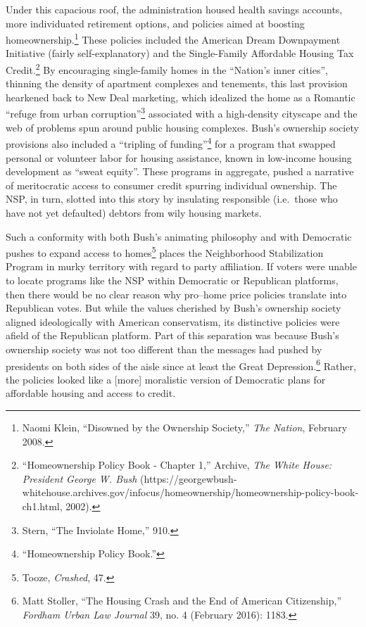 \documentclass[12pt,oneside]{psthesis}
\begin{document}
Under this capacious roof, the administration housed health savings accounts, more individuated retirement options, and policies aimed at boosting homeownership.\footnote{Naomi Klein, ``Disowned by the Ownership Society,'' \emph{The Nation}, February 2008.}
These policies included the American Dream Downpayment Initiative (fairly self-explanatory) and the Single-Family Affordable Housing Tax Credit.\footnote{``Homeownership Policy Book - Chapter 1,'' Archive, \emph{The White House: President George W. Bush} (https://georgewbush-whitehouse.archives.gov/infocus/homeownership/homeownership-policy-book-ch1.html, 2002).}
By encouraging single-family homes in the ``Nation's inner cities'', thinning the density of apartment complexes and tenements, this last provision hearkened back to New Deal marketing, which idealized the home as a Romantic ``refuge from urban corruption''\footnote{Stern, ``The Inviolate Home,'' 910.} associated with a high-density cityscape and the web of problems spun around public housing complexes.
Bush's ownership society provisions also included a ``tripling of funding''\footnote{``Homeownership Policy Book.''} for a program that swapped personal or volunteer labor for housing assistance, known in low-income housing development as ``sweat equity''.
These programs in aggregate, pushed a narrative of meritocratic access to consumer credit spurring individual ownership.
The NSP, in turn, slotted into this story by insulating responsible (i.e.~those who have not yet defaulted) debtors from wily housing markets.

Such a conformity with both Bush's animating philosophy and with Democratic pushes to expand access to homes\footnote{Tooze, \emph{Crashed}, 47.} places the Neighborhood Stabilization Program in murky territory with regard to party affiliation.
If voters were unable to locate programs like the NSP within Democratic or Republican platforms, then there would be no clear reason why pro--home price policies translate into Republican votes.
But while the values cherished by Bush's ownership society aligned ideologically with American conservatism, its distinctive policies were afield of the Republican platform.
Part of this separation was because Bush's ownership society was not too different than the messages had pushed by presidents on both sides of the aisle since at least the Great Depression.\footnote{Matt Stoller, ``The Housing Crash and the End of American Citizenship,'' \emph{Fordham Urban Law Journal} 39, no. 4 (February 2016): 1183.}
Rather, the policies looked like a {[}more{]} moralistic version of Democratic plans for affordable housing and access to credit.
\end{document}
